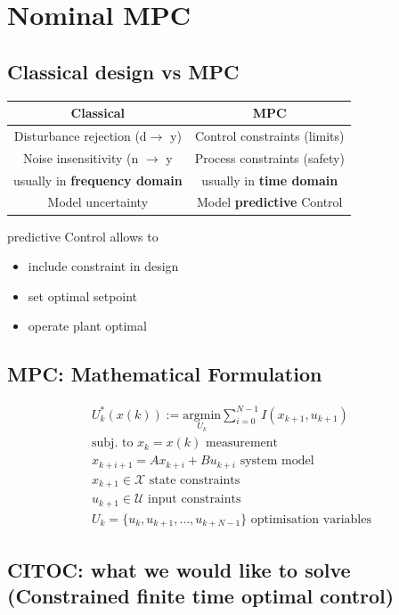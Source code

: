 \section{Nominal MPC}
 \subsection{Classical design vs MPC}
\begin{center}
\begin{tabular}{|c|c|}
     \hline
    \textbf{Classical} & \textbf{MPC} \\
    \hline
    Disturbance rejection (d$\rightarrow$ y) & Control constraints (limits)
    \\
    \hline
    Noise insensitivity (n $\rightarrow$ y & Process constraints (safety) \\
    \hline
    usually in \textbf{frequency domain} & usually in \textbf{time domain} \\ \hline
    Model uncertainty & Model \textbf{predictive} Control\\ \hline
\end{tabular}
\end{center}
predictive Control allows to \begin{itemize}
    \item include constraint in design
    \item set optimal setpoint
    \item operate plant optimal
\end{itemize}
\vfill\null\columnbreak
\subsection{MPC: Mathematical Formulation}
\begin{gather*}
    U^*_k(x(k)) := \underset{U_k}{\mathrm{argmin}}\sum^{N-1}_{i=0}I(x_{k+1},u_{k+1}) \\
    \textrm{subj. to } x_k = x(k) \textrm{ measurement} \\
    x_{k+i+1}= Ax_{k+i}+ Bu_{k+i} \textrm{ system model}
    \\
    x_{k+1} \in \mathcal{X} \textrm{ state constraints}\\
    u_{k+1} \in \mathcal{U} \textrm{ input constraints}\\
    U_k = \{u_k,u_{k+1}, \dots, u_{k+N-1}\} \textrm{ optimisation variables}
\end{gather*}
\subsection{CITOC: what we would like to solve ({\tiny Constrained finite time optimal control})}

